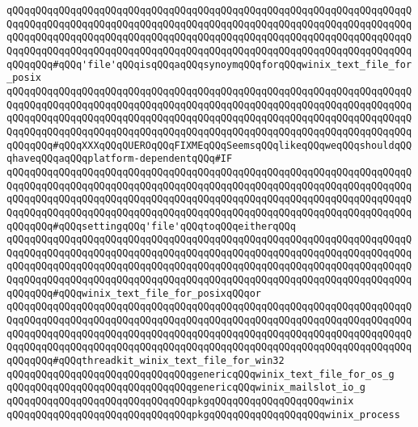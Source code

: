 \verb|qQQqqQQqqQQqqQQqqQQqqQQqqQQqqQQqqQQqqQQqqQQqqQQqqQQqqQQqqQQqqQQqqQQqqQQqqQQqqQQqqQQqqQQqqQQqqQQqqQQqqQQqqQQqqQQqqQQqqQQqqQQqqQQqqQQqqQQqqQQqqQQqqQQqqQQqqQQqqQQqqQQqqQQqqQQqqQQqqQQqqQQqqQQqqQQqqQQqqQQqqQQqqQQqqQQqqQQqqQQqqQQqqQQqqQQqqQQqqQQqqQQqqQQqqQQqqQQqqQQqqQQqqQQqqQQqqQQqqQQqqQQqqQQq#qQQq'file'qQQqisqQQqaqQQqsynoymqQQqforqQQqwinix_text_file_for_posix|\newline
\verb|qQQqqQQqqQQqqQQqqQQqqQQqqQQqqQQqqQQqqQQqqQQqqQQqqQQqqQQqqQQqqQQqqQQqqQQqqQQqqQQqqQQqqQQqqQQqqQQqqQQqqQQqqQQqqQQqqQQqqQQqqQQqqQQqqQQqqQQqqQQqqQQqqQQqqQQqqQQqqQQqqQQqqQQqqQQqqQQqqQQqqQQqqQQqqQQqqQQqqQQqqQQqqQQqqQQqqQQqqQQqqQQqqQQqqQQqqQQqqQQqqQQqqQQqqQQqqQQqqQQqqQQqqQQqqQQqqQQqqQQqqQQqqQQq#qQQqXXXqQQqQUEROqQQqFIXMEqQQqSeemsqQQqlikeqQQqweqQQqshouldqQQqhaveqQQqaqQQqplatform-dependentqQQq#IF|\newline
\verb|qQQqqQQqqQQqqQQqqQQqqQQqqQQqqQQqqQQqqQQqqQQqqQQqqQQqqQQqqQQqqQQqqQQqqQQqqQQqqQQqqQQqqQQqqQQqqQQqqQQqqQQqqQQqqQQqqQQqqQQqqQQqqQQqqQQqqQQqqQQqqQQqqQQqqQQqqQQqqQQqqQQqqQQqqQQqqQQqqQQqqQQqqQQqqQQqqQQqqQQqqQQqqQQqqQQqqQQqqQQqqQQqqQQqqQQqqQQqqQQqqQQqqQQqqQQqqQQqqQQqqQQqqQQqqQQqqQQqqQQqqQQqqQQq#qQQqsettingqQQq'file'qQQqtoqQQqeitherqQQq|\newline
\verb|qQQqqQQqqQQqqQQqqQQqqQQqqQQqqQQqqQQqqQQqqQQqqQQqqQQqqQQqqQQqqQQqqQQqqQQqqQQqqQQqqQQqqQQqqQQqqQQqqQQqqQQqqQQqqQQqqQQqqQQqqQQqqQQqqQQqqQQqqQQqqQQqqQQqqQQqqQQqqQQqqQQqqQQqqQQqqQQqqQQqqQQqqQQqqQQqqQQqqQQqqQQqqQQqqQQqqQQqqQQqqQQqqQQqqQQqqQQqqQQqqQQqqQQqqQQqqQQqqQQqqQQqqQQqqQQqqQQqqQQqqQQqqQQq#qQQqwinix_text_file_for_posixqQQqor|\newline
\verb|qQQqqQQqqQQqqQQqqQQqqQQqqQQqqQQqqQQqqQQqqQQqqQQqqQQqqQQqqQQqqQQqqQQqqQQqqQQqqQQqqQQqqQQqqQQqqQQqqQQqqQQqqQQqqQQqqQQqqQQqqQQqqQQqqQQqqQQqqQQqqQQqqQQqqQQqqQQqqQQqqQQqqQQqqQQqqQQqqQQqqQQqqQQqqQQqqQQqqQQqqQQqqQQqqQQqqQQqqQQqqQQqqQQqqQQqqQQqqQQqqQQqqQQqqQQqqQQqqQQqqQQqqQQqqQQqqQQqqQQqqQQqqQQq#qQQqthreadkit_winix_text_file_for_win32|\newline
\newline
\verb|qQQqqQQqqQQqqQQqqQQqqQQqqQQqqQQqgenericqQQqwinix_text_file_for_os_g|\newline
\verb|qQQqqQQqqQQqqQQqqQQqqQQqqQQqqQQqgenericqQQqwinix_mailslot_io_g|\newline
\newline
\verb|qQQqqQQqqQQqqQQqqQQqqQQqqQQqqQQqpkgqQQqqQQqqQQqqQQqqQQqwinix|\newline
\verb|qQQqqQQqqQQqqQQqqQQqqQQqqQQqqQQqpkgqQQqqQQqqQQqqQQqqQQqwinix_process|\newline
\newline
